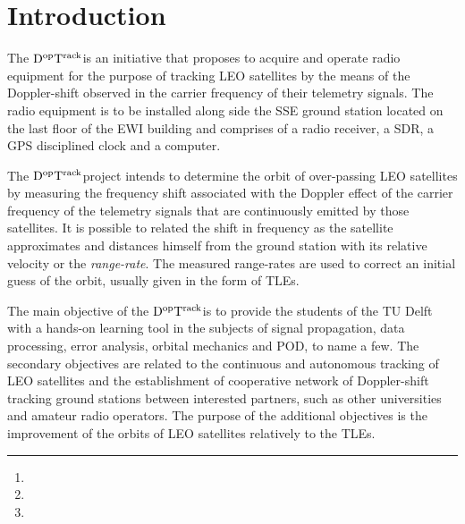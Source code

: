 \documentclass[11pt,a4paper,oneside]{article}
\title{\DocumentTitle}
\author{\AuthorNameA\thanks{\AffiliationA}, \AuthorNameB\thanks{\AffiliationB}, \AuthorNameC\thanks{\AffiliationC}}
\newcommand{\GroundStationName}{${\rm D^{\rm op}T^{\rm rack}}$}
\begin{document}
\let\ref\autoref
\let\pageref\autopageref


\maketitle




\section{Introduction}

The \GroundStationName is an initiative that proposes to acquire and operate radio equipment for the purpose of tracking \ac{LEO} satellites by the means of the Doppler-shift observed in the carrier frequency of their telemetry signals. The radio equipment is to be installed along side the \ac{SSE} ground station located on the last floor of the \ac{EWI} building and comprises of a radio receiver, a \ac{SDR}, a \ac{GPS} disciplined clock and a computer.

The \GroundStationName project intends to determine the orbit of over-passing \ac{LEO} satellites by measuring the frequency shift associated with the Doppler effect of the carrier frequency of the telemetry signals that are continuously emitted by those satellites. It is possible to related the shift in frequency as the satellite approximates and distances himself from the ground station with its relative velocity or the \emph{range-rate}. The measured range-rates are used to correct an initial guess of the orbit, usually given in the form of \acp{TLE}.

The main objective of the \GroundStationName is to provide the students of the TU Delft with a hands-on learning tool in the subjects of signal propagation, data processing, error analysis, orbital mechanics and \ac{POD}, to name a few. The secondary objectives are related to the continuous and autonomous tracking of \ac{LEO} satellites and the establishment of cooperative network of Doppler-shift tracking ground stations between interested partners, such as other universities and amateur radio operators. The purpose of the additional objectives is the improvement of the orbits of \ac{LEO} satellites relatively to the \acp{TLE}.
\end{document}
